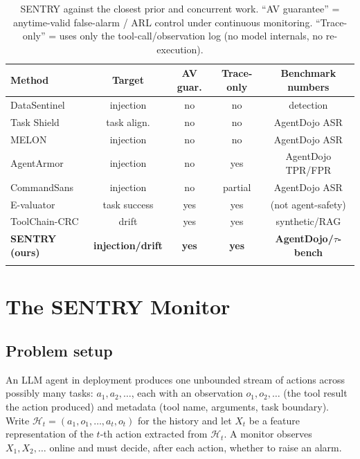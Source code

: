 \documentclass[pdflatex,sn-mathphys-num]{sn-jnl}%
\theoremstyle{thmstyleone}%
\theoremstyle{thmstyletwo}%
\theoremstyle{thmstylethree}%
\newcommand{\Hcal}{\mathcal{H}}
\begin{document}
\begin{table}[t]
\centering
\caption{SENTRY against the closest prior and concurrent work.
``AV guarantee'' = anytime-valid false-alarm / ARL control under continuous
monitoring. ``Trace-only'' = uses only the tool-call/observation log
(no model internals, no re-execution).}\label{tab:related}
\begin{tabular}{@{}lcccc@{}}
\toprule
Method & Target & AV guar. & Trace-only & Benchmark numbers \\
\midrule
DataSentinel~\cite{liu2025datasentinel}     & injection & no  & no  & detection \\
Task Shield~\cite{jia2024taskshield}         & task align.& no  & no  & AgentDojo ASR \\
MELON~\cite{zhu2025melon}                    & injection & no  & no  & AgentDojo ASR \\
AgentArmor~\cite{wang2025agentarmor}         & injection & no  & yes & AgentDojo TPR/FPR \\
CommandSans~\cite{das2025commandsans}        & injection & no  & partial & AgentDojo ASR \\
E-valuator~\cite{sadhuka2025evaluator}       & task success& yes & yes & (not agent-safety) \\
ToolChain-CRC~\cite{opoku2026toolchain}      & drift     & yes & yes & synthetic/RAG \\
\textbf{SENTRY (ours)} & \textbf{injection/drift} & \textbf{yes} & \textbf{yes} & \textbf{AgentDojo/$\tau$-bench} \\
\botrule
\end{tabular}
\end{table}

\section{The SENTRY Monitor}\label{sec:method}

\subsection{Problem setup}\label{sec:setup}

An LLM agent in deployment produces one unbounded stream of actions across
possibly many tasks: \(a_1,a_2,\dots\), each with an observation
\(o_1,o_2,\dots\) (the tool result the action produced) and metadata (tool
name, arguments, task boundary). Write \(\Hcal_t=(a_1,o_1,\dots,a_t,o_t)\) for
the history and let \(X_t\) be a feature representation of the \(t\)-th action
extracted from \(\Hcal_t\). A monitor observes \(X_1,X_2,\dots\) online and
must decide, after each action, whether to raise an alarm.
\end{document}

